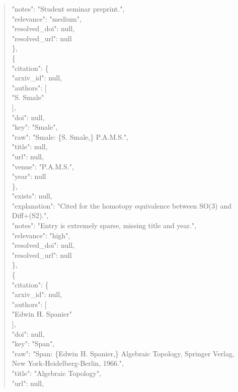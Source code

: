 \documentclass[11pt]{article}
\begin{document}
\begin{quote}
      "notes": "Student seminar preprint.",\\
      "relevance": "medium",\\
      "resolved\_doi": null,\\
      "resolved\_url": null\\
    \},\\
    \{\\
      "citation": \{\\
        "arxiv\_id": null,\\
        "authors": [\\
          "S. Smale"\\
        ],\\
        "doi": null,\\
        "key": "Smale",\\
        "raw": "Smale: \{S. Smale,\} P.A.M.S.",\\
        "title": null,\\
        "url": null,\\
        "venue": "P.A.M.S.",\\
        "year": null\\
      \},\\
      "exists": null,\\
      "explanation": "Cited for the homotopy equivalence between SO(3) and Diff+(S2).",\\
      "notes": "Entry is extremely sparse, missing title and year.",\\
      "relevance": "high",\\
      "resolved\_doi": null,\\
      "resolved\_url": null\\
    \},\\
    \{\\
      "citation": \{\\
        "arxiv\_id": null,\\
        "authors": [\\
          "Edwin H. Spanier"\\
        ],\\
        "doi": null,\\
        "key": "Span",\\
        "raw": "Span: \{Edwin H. Spanier,\} Algebraic Topology, Springer Verlag, New York-Heidelberg-Berlin, 1966.",\\
        "title": "Algebraic Topology",\\
        "url": null,\\

\end{quote}
\end{document}
